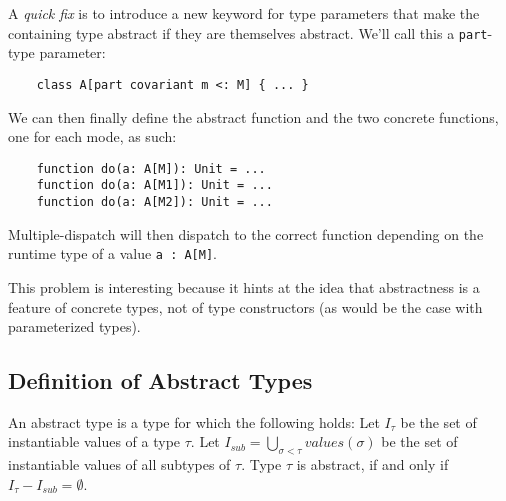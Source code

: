 A \textit{quick fix} is to introduce a new keyword for type parameters that make the containing type abstract if they are themselves abstract. We'll call this a \texttt{part}-type parameter:

\begin{lstlisting}
    class A[part covariant m <: M] { ... }
\end{lstlisting}

We can then finally define the abstract function and the two concrete functions, one for each mode, as such:

\begin{lstlisting}
    function do(a: A[M]): Unit = ...
    function do(a: A[M1]): Unit = ...
    function do(a: A[M2]): Unit = ...
\end{lstlisting}

Multiple-dispatch will then dispatch to the correct function depending on the runtime type of a value \texttt{a : A[M]}.

This problem is interesting because it hints at the idea that abstractness is a feature of concrete types, not of type constructors (as would be the case with parameterized types).


\subsection{Definition of Abstract Types}
An abstract type is a type for which the following holds: Let $I_\tau$ be the set of instantiable values of a type $\tau$. Let $I_{sub} = \bigcup_{\sigma < \tau} values(\sigma)$ be the set of instantiable values of all subtypes of $\tau$. Type $\tau$ is abstract, if and only if $I_\tau - I_{sub} = \emptyset$.






